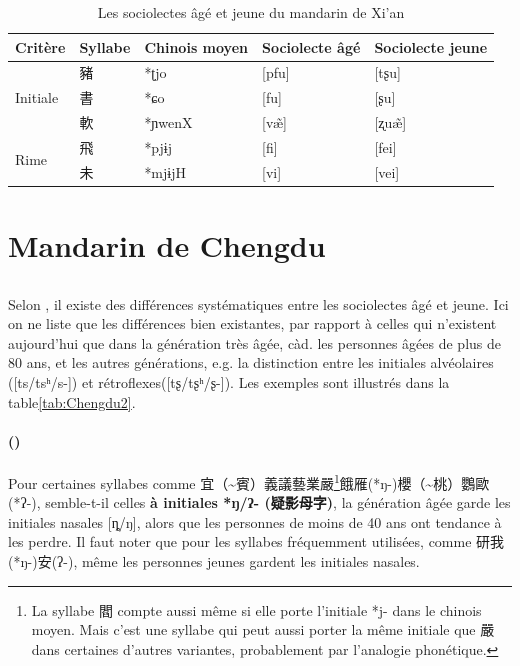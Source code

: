 \documentclass{scrbook}
\newcounter{c}[subsubsection]
\newcommand{\stpc}[1]{\stepcounter{#1}}
\newcommand{\bolang}{\textasciitilde}
\newcommand{\difwenbai}{couches archaïque et récente\xspace}
\newcommand{\diflaoxin}{sociolectes âgé et jeune\xspace}
\newcommand{\iso}{syllabes isolées\xspace}
\newcommand{\illustre}{Les exemples sont illustrés dans la table\xspace}
\newcommand{\termyyx}[1]{\textbf{#1}}
\begin{document}
\begin{sloppypar}
\begin{table}[htbp]
  \centering
    \begin{tabular}{lllll}
    \toprule
    Critère & Syllabe & Chinois moyen  & Sociolecte âgé & Sociolecte jeune \\
    \midrule
    \multirow{3}[2]{*}{Initiale} & 豬     & *ʈjo  & [pfu] & [tʂu] \\
          & 書     & *ɕo   & [fu]  & [ʂu] \\
          & 軟     & *ɲwenX & [væ̃] & [ʐuæ̃] \\
    \midrule
    \multirow{2}[2]{*}{Rime} & 飛     & *pjɨj & [fi]  & [fei] \\
          & 未     & *mjɨjH & [vi]  & [vei] \\
    \bottomrule
    \end{tabular}%
  \caption{Les \diflaoxin du mandarin de Xi'an}
  \label{tab:Xi'an2}%
\end{table}%

\section{Mandarin de Chengdu}

\subsection{\MakeCapital{\diflaoxin}}
Selon \textcite[4--8]{Liang1998Chendu}, il existe des différences systématiques entre les \diflaoxin. Ici on ne liste que les différences bien existantes, par rapport à celles qui n'existent aujourd'hui que dans la génération très âgée, càd. les personnes âgées de plus de 80 ans, et les autres générations, e.g. la distinction entre les initiales alvéolaires ([ts/tsʰ/s-]) et rétroflexes([tʂ/tʂʰ/ʂ-]). \illustre \ref{tab:Chengdu2}.

\stpc{c}\paragraph{()}
Pour certaines syllabes comme 宜（\bolang 賓）義議藝業嚴\footnote{La syllabe 閻 compte aussi même si elle porte l'initiale *j- dans le chinois moyen. Mais c'est une syllabe qui peut aussi porter la même initiale que 嚴 dans certaines d'autres variantes, probablement par l'analogie phonétique.}餓雁(*ŋ-)櫻（\bolang 桃）鸚歐(*ʔ-), semble-t-il celles \termyyx{à initiales *ŋ/ʔ- (疑影母字)}, la génération âgée garde les initiales nasales [ȵ/ŋ], alors que les personnes de moins de 40 ans ont tendance à les perdre. Il faut noter que pour les syllabes fréquemment utilisées, comme 研我(*ŋ-)安(ʔ-), même les personnes jeunes gardent les initiales nasales.


\end{sloppypar}
\end{document}
